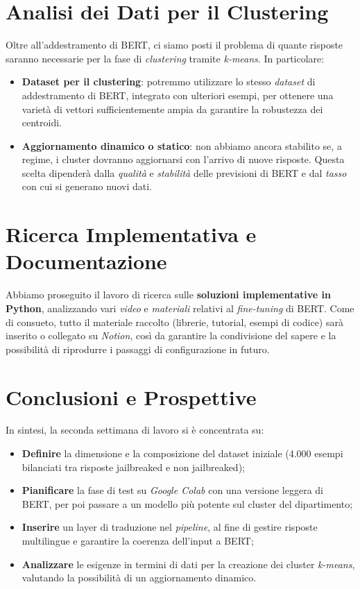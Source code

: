 \documentclass[a4paper,12pt]{article}
\begin{document}
\section*{Analisi dei Dati per il Clustering}
Oltre all’addestramento di BERT, ci siamo posti il problema di quante risposte saranno necessarie per la fase di \emph{clustering} tramite \emph{k-means}. In particolare:
\begin{itemize}
    \item \textbf{Dataset per il clustering}: potremmo utilizzare lo stesso \emph{dataset} di addestramento di BERT, integrato con ulteriori esempi, per ottenere una varietà di vettori sufficientemente ampia da garantire la robustezza dei centroidi.
    \item \textbf{Aggiornamento dinamico o statico}: non abbiamo ancora stabilito se, a regime, i cluster dovranno aggiornarsi con l’arrivo di nuove risposte. Questa scelta dipenderà dalla \emph{qualità} e \emph{stabilità} delle previsioni di BERT e dal \emph{tasso} con cui si generano nuovi dati.
\end{itemize}

\section*{Ricerca Implementativa e Documentazione}
Abbiamo proseguito il lavoro di ricerca sulle \textbf{soluzioni implementative in Python}, analizzando vari \emph{video} e \emph{materiali} relativi al \emph{fine-tuning} di BERT. Come di consueto, tutto il materiale raccolto (librerie, tutorial, esempi di codice) sarà inserito o collegato su \emph{Notion}, così da garantire la condivisione del sapere e la possibilità di riprodurre i passaggi di configurazione in futuro.

\section*{Conclusioni e Prospettive}
In sintesi, la seconda settimana di lavoro si è concentrata su:
\begin{itemize}
    \item \textbf{Definire} la dimensione e la composizione del dataset iniziale (4.000 esempi bilanciati tra risposte jailbreaked e non jailbreaked);
    \item \textbf{Pianificare} la fase di test su \emph{Google Colab} con una versione leggera di BERT, per poi passare a un modello più potente sul cluster del dipartimento;
    \item \textbf{Inserire} un layer di traduzione nel \emph{pipeline}, al fine di gestire risposte multilingue e garantire la coerenza dell’input a BERT;
    \item \textbf{Analizzare} le esigenze in termini di dati per la creazione dei cluster \emph{k-means}, valutando la possibilità di un aggiornamento dinamico.
\end{itemize}
\end{document}
